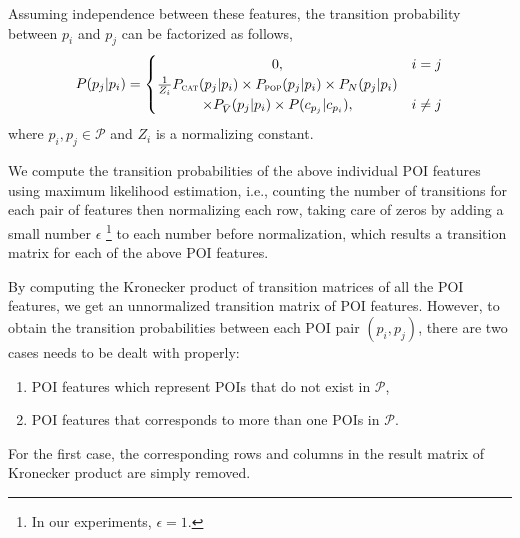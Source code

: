 Assuming independence between these features,
the transition probability between $p_i$ and $p_j$ can be factorized as follows,
\begin{displaymath}
    P(p_j | p_i) = 
    \begin{cases} 
    \hfill 0, \hfill & i = j \\
    \hfill \frac{1}{Z_i} P_{\textsc{cat}}(p_j | p_i) \times P_{\textsc{pop}}(p_j | p_i) \times P_N(p_j | p_i) \\
    \hfill \times P_{\bar{V}}(p_j | p_i) \times P(c_{p_j} | c_{p_i}), \hfill & i \ne j 
    \end{cases}
\end{displaymath}
where $p_i, p_j \in \mathcal{P}$ and $Z_i$ is a normalizing constant.


We compute the transition probabilities of the above individual POI features 
using maximum likelihood estimation, 
i.e., counting the number of transitions for each pair of features then normalizing each row,
taking care of zeros by adding a small number $\epsilon$
\footnote{In our experiments, $\epsilon = 1$.}
to each number before normalization,
which results a transition matrix for each of the above POI features.

By computing the Kronecker product of transition matrices of all the POI features,
we get an unnormalized transition matrix of POI features.
However, to obtain the transition probabilities between each POI pair $(p_i, p_j)$,
there are two cases needs to be dealt with properly:
\begin{enumerate}
\item POI features which represent POIs that do not exist in $\mathcal{P}$,
\item POI features that corresponds to more than one POIs in $\mathcal{P}$.
\end{enumerate}

For the first case, 
the corresponding rows and columns in the result matrix of Kronecker product are simply removed.

